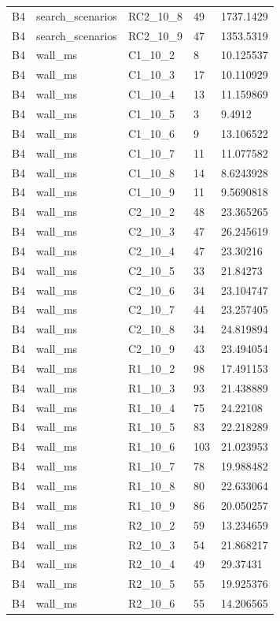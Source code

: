 \begin{longtable}{lllll}
B4 & search\_scenarios & RC2\_10\_8 & 49 & 1737.1429 \\
B4 & search\_scenarios & RC2\_10\_9 & 47 & 1353.5319 \\
B4 & wall\_ms & C1\_10\_2 & 8 & 10.125537 \\
B4 & wall\_ms & C1\_10\_3 & 17 & 10.110929 \\
B4 & wall\_ms & C1\_10\_4 & 13 & 11.159869 \\
B4 & wall\_ms & C1\_10\_5 & 3 & 9.4912 \\
B4 & wall\_ms & C1\_10\_6 & 9 & 13.106522 \\
B4 & wall\_ms & C1\_10\_7 & 11 & 11.077582 \\
B4 & wall\_ms & C1\_10\_8 & 14 & 8.6243928 \\
B4 & wall\_ms & C1\_10\_9 & 11 & 9.5690818 \\
B4 & wall\_ms & C2\_10\_2 & 48 & 23.365265 \\
B4 & wall\_ms & C2\_10\_3 & 47 & 26.245619 \\
B4 & wall\_ms & C2\_10\_4 & 47 & 23.30216 \\
B4 & wall\_ms & C2\_10\_5 & 33 & 21.84273 \\
B4 & wall\_ms & C2\_10\_6 & 34 & 23.104747 \\
B4 & wall\_ms & C2\_10\_7 & 44 & 23.257405 \\
B4 & wall\_ms & C2\_10\_8 & 34 & 24.819894 \\
B4 & wall\_ms & C2\_10\_9 & 43 & 23.494054 \\
B4 & wall\_ms & R1\_10\_2 & 98 & 17.491153 \\
B4 & wall\_ms & R1\_10\_3 & 93 & 21.438889 \\
B4 & wall\_ms & R1\_10\_4 & 75 & 24.22108 \\
B4 & wall\_ms & R1\_10\_5 & 83 & 22.218289 \\
B4 & wall\_ms & R1\_10\_6 & 103 & 21.023953 \\
B4 & wall\_ms & R1\_10\_7 & 78 & 19.988482 \\
B4 & wall\_ms & R1\_10\_8 & 80 & 22.633064 \\
B4 & wall\_ms & R1\_10\_9 & 86 & 20.050257 \\
B4 & wall\_ms & R2\_10\_2 & 59 & 13.234659 \\
B4 & wall\_ms & R2\_10\_3 & 54 & 21.868217 \\
B4 & wall\_ms & R2\_10\_4 & 49 & 29.37431 \\
B4 & wall\_ms & R2\_10\_5 & 55 & 19.925376 \\
B4 & wall\_ms & R2\_10\_6 & 55 & 14.206565 \\

\end{longtable}
